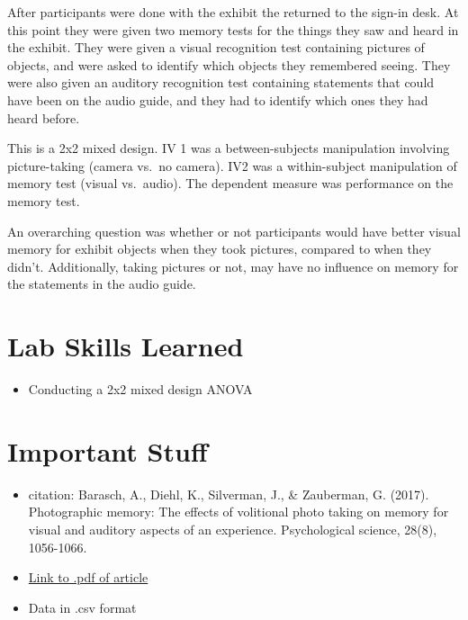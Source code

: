 \documentclass[
]{book}
\providecommand{\tightlist}{%
  \setlength{\itemsep}{0pt}\setlength{\parskip}{0pt}}
\begin{document}
After participants were done with the exhibit the returned to the sign-in desk. At this point they were given two memory tests for the things they saw and heard in the exhibit. They were given a visual recognition test containing pictures of objects, and were asked to identify which objects they remembered seeing. They were also given an auditory recognition test containing statements that could have been on the audio guide, and they had to identify which ones they had heard before.

This is a 2x2 mixed design. IV 1 was a between-subjects manipulation involving picture-taking (camera vs.~no camera). IV2 was a within-subject manipulation of memory test (visual vs.~audio). The dependent measure was performance on the memory test.

An overarching question was whether or not participants would have better visual memory for exhibit objects when they took pictures, compared to when they didn't. Additionally, taking pictures or not, may have no influence on memory for the statements in the audio guide.

\hypertarget{lab-skills-learned-5}{%
\section{Lab Skills Learned}\label{lab-skills-learned-5}}

\begin{itemize}
\tightlist
\item
  Conducting a 2x2 mixed design ANOVA
\end{itemize}

\hypertarget{important-stuff-5}{%
\section{Important Stuff}\label{important-stuff-5}}

\begin{itemize}
\tightlist
\item
  citation: Barasch, A., Diehl, K., Silverman, J., \& Zauberman, G. (2017). Photographic memory: The effects of volitional photo taking on memory for visual and auditory aspects of an experience. Psychological science, 28(8), 1056-1066.
\item
  \href{http://journals.sagepub.com/doi/abs/10.1177/0956797617694868}{Link to .pdf of article}
\item
  Data in .csv format
\end{itemize}
\end{document}
